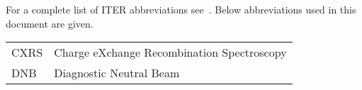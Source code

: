 \documentclass[../main.tex]{subfiles}
\begin{document}
For a complete list of ITER abbreviations see~\cite{iter_abbr}. Below abbreviations used in this document are given.

\begin{table}[ht]
    \begin{tabular}{l l}
        CXRS & Charge eXchange Recombination Spectroscopy \\
        DNB  & Diagnostic Neutral Beam                    \\
    \end{tabular}
\end{table}
\end{document}
